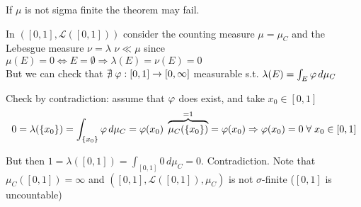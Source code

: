 \begin{remark}
    If \(\mu\) is not sigma finite the theorem may fail.
\end{remark}
\begin{example}
    In \(\left(\left[0, 1\right], \mathcal{L}\left(\left[0, 1\right]\right)\right)\) consider the counting measure \(\mu = \mu_C\) and the Lebesgue measure \(\nu= \lambda\)
    \(\nu \ll \mu\) since \(\mu(E)= 0 \Leftrightarrow E= \emptyset \Rightarrow \lambda(E) = \nu(E)=0\) \\
    But we can check that \( \nexists \; \oldphi : \left[0, 1\right] \rightarrow \left[0, \infty \right]\) measurable s.t. \(\lambda(E)= \int_E \oldphi \, d\mu_C\)

    Check by contradiction: assume that \(\oldphi \) does exist, and take \(x_0 \in \left[0, 1\right]\)
    \[ 
        0 = \lambda (\left\{x_0\right\}) = \int_{\left\{x_0\right\}} \oldphi \, d\mu_C = \oldphi (x_0) \; \overbrace{\mu_C (\left\{x_0\right\})}^{=1}= \oldphi (x_0) \Rightarrow \oldphi (x_0) = 0 \; \forall \; x_0 \in \left[0, 1\right]\]
    
    But then \(1 = \lambda(\left[0, 1\right]) = \int_{\left[0, 1\right]} 0 \, d\mu_C = 0\). Contradiction.
    Note that \(\mu_C (\left[0, 1\right]) = \infty \) and \(\left( \left[0,1\right], \mathcal{L}(\left[0, 1\right]), \mu_C\right)\) is not \(\sigma\)-finite (\(\left[0,1\right]\) is uncountable)
\end{example}
